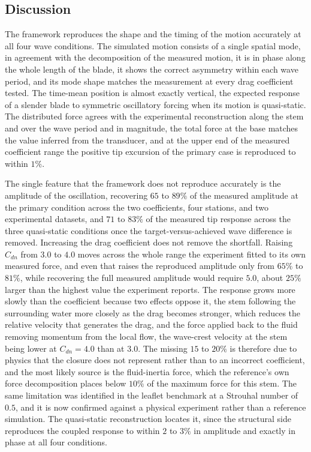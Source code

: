\subsection{Discussion}
\label{sec:flexveg_discussion}
The framework reproduces the shape and the timing of the motion accurately at all four wave conditions. The simulated motion consists of a single spatial mode, in agreement with the decomposition of the measured motion, it is in phase along the whole length of the blade, it shows the correct asymmetry within each wave period, and its mode shape matches the measurement at every drag coefficient tested. The time-mean position is almost exactly vertical, the expected response of a slender blade to symmetric oscillatory forcing when its motion is quasi-static. The distributed force agrees with the experimental reconstruction along the stem and over the wave period and in magnitude, the total force at the base matches the value inferred from the transducer, and at the upper end of the measured coefficient range the positive tip excursion of the primary case is reproduced to within $1\%$.

\noindent
The single feature that the framework does not reproduce accurately is the amplitude of the oscillation, recovering $65$ to $89\%$ of the measured amplitude at the primary condition across the two coefficients, four stations, and two experimental datasets, and $71$ to $83\%$ of the measured tip response across the three quasi-static conditions once the target-versus-achieved wave difference is removed. Increasing the drag coefficient does not remove the shortfall. Raising $C_{dn}$ from $3.0$ to $4.0$ moves across the whole range the experiment fitted to its own measured force, and even that raises the reproduced amplitude only from $65\%$ to $81\%$, while recovering the full measured amplitude would require $5.0$, about $25\%$ larger than the highest value the experiment reports. The response grows more slowly than the coefficient because two effects oppose it, the stem following the surrounding water more closely as the drag becomes stronger, which reduces the relative velocity that generates the drag, and the force applied back to the fluid removing momentum from the local flow, the wave-crest velocity at the stem being lower at $C_{dn} = 4.0$ than at $3.0$. The missing $15$ to $20\%$ is therefore due to physics that the closure does not represent rather than to an incorrect coefficient, and the most likely source is the fluid-inertia force, which the reference's own force decomposition places below $10\%$ of the maximum force for this stem. The same limitation was identified in the leaflet benchmark at a Strouhal number of $0.5$, and it is now confirmed against a physical experiment rather than a reference simulation. The quasi-static reconstruction locates it, since the structural side reproduces the coupled response to within $2$ to $3\%$ in amplitude and exactly in phase at all four conditions.


